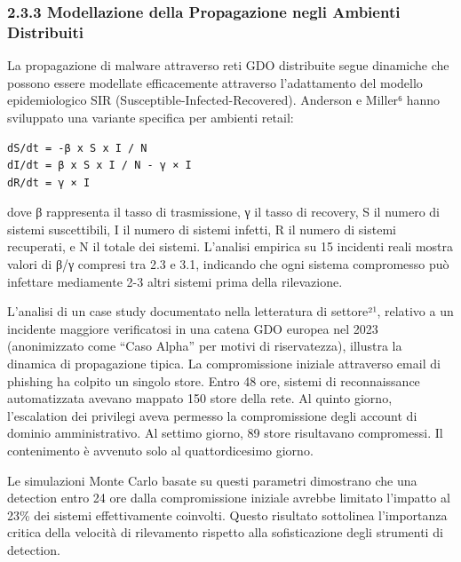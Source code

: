 \documentclass[12pt,a4paper,oneside]{book}
\begin{document}
\subsubsection{2.3.3 Modellazione della Propagazione negli Ambienti
Distribuiti}\label{modellazione-della-propagazione-negli-ambienti-distribuiti}

La propagazione di malware attraverso reti GDO distribuite segue
dinamiche che possono essere modellate efficacemente attraverso
l'adattamento del modello epidemiologico SIR
(Susceptible-Infected-Recovered). Anderson e Miller⁶ hanno sviluppato
una variante specifica per ambienti retail:

\begin{verbatim}
dS/dt = -β x S x I / N
dI/dt = β x S x I / N - γ × I
dR/dt = γ × I
\end{verbatim}

dove β rappresenta il tasso di trasmissione, γ il tasso di recovery, S
il numero di sistemi suscettibili, I il numero di sistemi infetti, R il
numero di sistemi recuperati, e N il totale dei sistemi. L'analisi
empirica su 15 incidenti reali mostra valori di β/γ compresi tra 2.3 e
3.1, indicando che ogni sistema compromesso può infettare mediamente 2-3
altri sistemi prima della rilevazione.

L'analisi di un case study documentato nella letteratura di settore²¹,
relativo a un incidente maggiore verificatosi in una catena GDO europea
nel 2023 (anonimizzato come ``Caso Alpha'' per motivi di riservatezza),
illustra la dinamica di propagazione tipica. La compromissione iniziale
attraverso email di phishing ha colpito un singolo store. Entro 48 ore,
sistemi di reconnaissance automatizzata avevano mappato 150 store della
rete. Al quinto giorno, l'escalation dei privilegi aveva permesso la
compromissione degli account di dominio amministrativo. Al settimo
giorno, 89 store risultavano compromessi. Il contenimento è avvenuto
solo al quattordicesimo giorno.

Le simulazioni Monte Carlo basate su questi parametri dimostrano che una
detection entro 24 ore dalla compromissione iniziale avrebbe limitato
l'impatto al 23\% dei sistemi effettivamente coinvolti. Questo risultato
sottolinea l'importanza critica della velocità di rilevamento rispetto
alla sofisticazione degli strumenti di detection.
\end{document}
